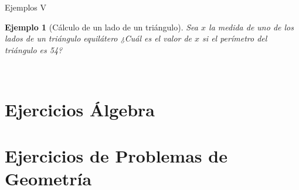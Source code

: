 \documentclass[9pt]{beamer}
\newcommand{\norma}[1]{\lVert #1 \rVert}
\newcommand{\mb}[2]{\mathbb{#1}^#2}
\newtheorem{Eje}{\textbf{Ejemplo}}[section]
\begin{document}
\begin{frame}{Ejemplos V}
\begin{Eje}[Cálculo de un lado de un triángulo]
Sea $x$ la medida de uno de los lados de un triángulo equilátero ¿Cuál es el valor de $x$ si el perímetro del triángulo es 54?
\end{Eje}
\begin{multicols}{2}
\textcolor{red}{
\\
}
\end{multicols}
\end{frame}
\section[Ejercicios Álgebra]{Ejercicios Álgebra}
{

}
{

}
{

}
\section[Ejercicios Geometría]{Ejercicios  de Problemas de Geometría}
{

}
{

}
\end{document}
